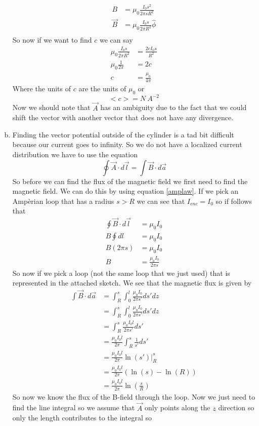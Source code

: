 \documentclass[11pt]{article}
\numberwithin{equation}{section}
\begin{document}
\begin{enumerate}[(a)]
\begin{align*}
B &= \mu_0\frac{I_0s^2}{2\pi sR^2}\\
\vec{B} &= \mu_0\frac{I_0s}{2\pi R^2}\hat{\phi}\\
\end{align*}
So now if we want to find $c$ we can say
\begin{align*}
\mu_0\frac{I_0s}{2\pi R^2} &= \frac{2cI_0s}{R^2}\\
\mu_0\frac{1}{2\pi} &= {2c}\\
c &= \frac{\mu_0}{4\pi}
\end{align*}
Where the units of $c$ are the units of $\mu_0$ or 
$$<c> = N\ A^{-2}$$
Now we should note that $\vec{A}$ has an ambiguity due to the fact that we could shift the vector with another vector that does not have any divergence.

\item
Finding the vector potential outside of the cylinder is a tad bit difficult because our current goes to infinity. So we do not have a localized current distribution we have to use the equation
$$\oint\vec{A}\cdot d\vec{l} = \int \vec{B}\cdot d\vec{a}$$
So before we can find the flux of the magnetic field we first need to find the magnetic field. We can do this by using equation \ref{amplaw}. If we pick an Amp\`{e}rian loop that has a radius $s>R$ we can see that $I_{enc} = I_0$ so if follows that
\begin{align*}
\oint\vec{B}\cdot d\vec{l} &= \mu_0I_0\\
B\oint dl &= \mu_0I_0\\
B(2\pi s) &= \mu_0I_0\\
B &= \frac{\mu_0I_0}{2\pi s}
\end{align*}
So now if we pick a loop (not the same loop that we just used) that is represented in the attached sketch. We see that the magnetic flux is given by
\begin{align*}
\int\vec{B}\cdot d\vec{a} &= \int_R^s\int_0^l\frac{\mu_0I_0}{2\pi s'}ds'dz\\
&= \int_R^s\int_0^l\frac{\mu_0I_0}{2\pi s'}ds'dz\\
&= \int_R^s\frac{\mu_0I_0l}{2\pi s'}ds'\\
&= \frac{\mu_0I_0l}{2\pi} \int_R^s\frac{1}{s'}ds'\\
&= \frac{\mu_0I_0l}{2\pi} \left.\ln(s')\right|_R^s\\
&= \frac{\mu_0I_0l}{2\pi} \left(\ln(s)-\ln(R)\right)\\
&= \frac{\mu_0I_0l}{2\pi} \ln\left(\frac{s}{R}\right)
\end{align*}
So now we know the flux of the B-field through the loop. Now we just need to find the line integral so we assume that $\vec{A}$ only points along the $z$ direction so only the length contributes to the integral so

\end{enumerate}
\end{document}
